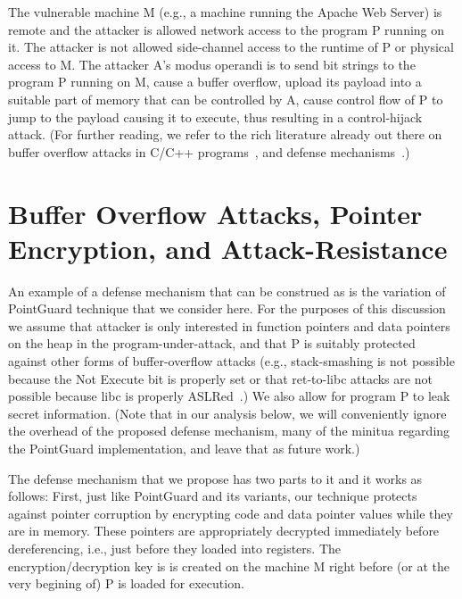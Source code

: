 The vulnerable machine M (e.g., a machine running the Apache Web
Server) is remote and the attacker is allowed network access to the
program P running on it. The attacker is not allowed side-channel
access to the runtime of P or physical access to M. The attacker A's
modus operandi is to send bit strings to the program P running on M,
cause a buffer overflow, upload its payload into a suitable part of
memory that can be controlled by A, cause control flow of P to jump to
the payload causing it to execute, thus resulting in a control-hijack
attack. (For further reading, we refer to the rich literature already
out there on buffer overflow attacks in C/C++
programs~\cite{erickson2008hacking, rop}, and defense
mechanisms~\cite{aslr}.)

  \section{Buffer Overflow Attacks, Pointer Encryption, and
    Attack-Resistance}

  An example of a defense mechanism that can be construed as
  \resistance is the variation of PointGuard \cite{tuck2004hardware}
  technique that we consider here. For the purposes of this discussion
  we assume that attacker is only interested in function pointers and
  data pointers on the heap in the program-under-attack, and that P is
  suitably protected against other forms of buffer-overflow attacks
  (e.g., stack-smashing is not possible because the Not Execute bit is
  properly set or that ret-to-libc attacks are not possible because
  libc is properly ASLRed~\cite{aslr}.) We also allow for program P to
  leak secret information. (Note that in our analysis below, we will
  conveniently ignore the overhead of the proposed defense mechanism,
  many of the minitua regarding the PointGuard implementation, and
  leave that as future work.)

  The defense mechanism that we propose has two parts to it and it
  works as follows: First, just like PointGuard and its variants, our
  technique protects against pointer corruption by encrypting code and
  data pointer values while they are in memory. These pointers are
  appropriately decrypted immediately before dereferencing, i.e., just
  before they loaded into registers. The encryption/decryption key is
  is created on the machine M right before (or at the very begining
  of) P is loaded for execution.


